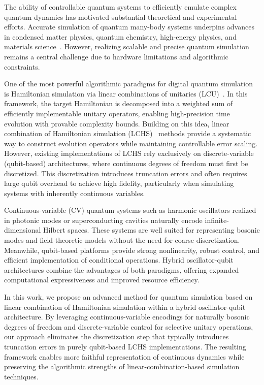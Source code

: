 \documentclass{article}
\begin{document}
The ability of controllable quantum systems to efficiently emulate complex quantum dynamics has motivated substantial theoretical and experimental efforts. Accurate simulation of quantum many-body systems underpins advances in condensed matter physics, quantum chemistry, high-energy physics, and materials science~\cite{Clinton_2024}. However, realizing scalable and precise quantum simulation remains a central challenge due to hardware limitations and algorithmic constraints.

One of the most powerful algorithmic paradigms for digital quantum simulation is Hamiltonian simulation via linear combinations of unitaries (LCU)~\cite{2012}. In this framework, the target Hamiltonian is decomposed into a weighted sum of efficiently implementable unitary operators, enabling high-precision time evolution with provable complexity bounds. Building on this idea, linear combination of Hamiltonian simulation (LCHS)~\cite{LCHS1,LCHS2} methods provide a systematic way to construct evolution operators while maintaining controllable error scaling. However, existing implementations of LCHS rely exclusively on discrete-variable (qubit-based) architectures, where continuous degrees of freedom must first be discretized. This discretization introduces truncation errors and often requires large qubit overhead to achieve high fidelity, particularly when simulating systems with inherently continuous variables.

Continuous-variable (CV) quantum systems such as harmonic oscillators realized in photonic modes or superconducting cavities naturally encode infinite-dimensional Hilbert spaces. These systems are well suited for representing bosonic modes and field-theoretic models without the need for coarse discretization. Meanwhile, qubit-based platforms provide strong nonlinearity, robust control, and efficient implementation of conditional operations. Hybrid oscillator-qubit architectures combine the advantages of both paradigms, offering expanded computational expressiveness and improved resource efficiency.

In this work, we propose an advanced method for quantum simulation based on linear combination of Hamiltonian simulation within a hybrid oscillator-qubit architecture. By leveraging continuous-variable encodings for naturally bosonic degrees of freedom and discrete-variable control for selective unitary operations, our approach eliminates the discretization step that typically introduces truncation errors in purely qubit-based LCHS implementations. The resulting framework enables more faithful representation of continuous dynamics while preserving the algorithmic strengths of linear-combination-based simulation techniques.
\end{document}
